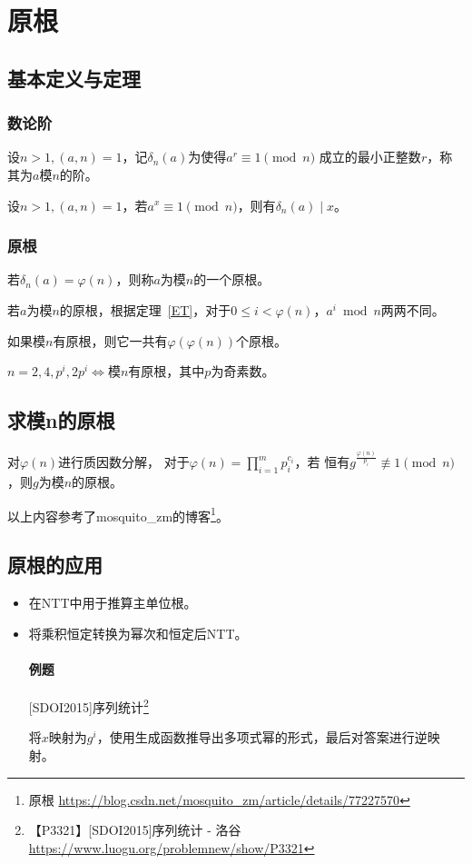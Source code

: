 \section{原根}\label{PrimitiveRoot}
\subsection{基本定义与定理}
\subsubsection{数论阶}
设$n>1,(a,n)=1$，记$\delta_n(a)$为使得$a^r\equiv 1 \pmod{n}$
成立的最小正整数$r$，称其为$a$模$n$的阶。

\begin{theorem}
	设$n>1,(a,n)=1$，若$a^x\equiv 1 \pmod{n}$，则有$\delta_n(a)\mid x$。
\end{theorem}

\subsubsection{原根}
若$\delta_n(a)=\varphi(n)$，则称$a$为模$n$的一个原根。

若$a$为模$n$的原根，根据定理~\ref{ET}，对于$0\leq i< \varphi(n)$，$a^i\bmod{n}$两两不同。

\begin{theorem}
	如果模$n$有原根，则它一共有$\varphi(\varphi(n))$个原根。
\end{theorem}

\begin{theorem}
	$n=2,4,p^i,2p^i\Leftrightarrow$模$n$有原根，其中$p$为奇素数。
\end{theorem}

\subsection{求模n的原根}

对$\varphi(n)$进行质因数分解，
对于$\displaystyle \varphi(n)=\prod_{i=1}^m{p_i^{c_i}}$，若
恒有$g^\frac{\varphi(n)}{p_i}\not\equiv 1 \pmod{n}$，则$g$为模$n$的原根。

以上内容参考了mosquito\_zm的博客\footnote{原根
	\url{https://blog.csdn.net/mosquito\_zm/article/details/77227570}}。
\subsection{原根的应用}
\begin{itemize}
	\item 在NTT中用于推算主单位根。
	\item 将乘积恒定转换为幂次和恒定后NTT。
	\paragraph{例题} [SDOI2015]序列统计\footnote{【P3321】[SDOI2015]序列统计 - 洛谷
	\url{https://www.luogu.org/problemnew/show/P3321}}

	将$x$映射为$g^i$，使用生成函数推导出多项式幂的形式，最后对答案进行逆映射。

\end{itemize}


